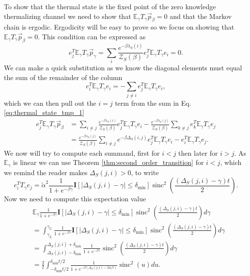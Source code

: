 \documentclass{article}
\newcommand{\EE}{\mathbb{E}}
\newcommand{\partfun}{\mathcal{Z}}
\DeclareMathOperator{\sinc}{sinc}
\begin{document}
To show that the thermal state is the fixed point of the zero knowledge thermalizing channel we need to show that 
$\EE_\gamma T_\gamma \vec{p}_{\beta} = 0$ and that the Markov chain is ergodic. Ergodicity will be easy to prove so we focus on showing that $\EE_\gamma T_\gamma \vec{p}_{\beta} = 0$. This condition can be expressed as
\begin{equation}
    e_j^T \EE_\gamma T_\gamma \vec{p}_{\gamma} = \sum_i \frac{e^{-\beta \lambda_S(i)}}{\partfun_S(\beta)} e_j^T \EE_\gamma T_\gamma e_i = 0.   \label{eq:thermal_state_tmp_1}
\end{equation}
We can make a quick substitution as we know the diagonal elements must equal the sum of the remainder of the column 
\begin{equation}
    e_i^T \EE_\gamma T_\gamma e_i = - \sum_{j \neq i} e_j^T \EE_\gamma T_\gamma e_i,
\end{equation}
which we can then pull out the $i = j$ term from the sum in Eq. \eqref{eq:thermal_state_tmp_1}
\begin{align}
    e_j^T \EE_\gamma T_\gamma \vec{p}_{\beta} &= \sum_{i \neq j} \frac{e^{-\beta \lambda_S(i)}}{\partfun_S(\beta)} e_j^T \EE_\gamma T_\gamma e_i - \frac{e^{-\beta \lambda_S(j)}}{\partfun_S(\beta)} \sum_{k \neq j} e_k^T \EE_\gamma T_\gamma e_j \\
    &= \frac{e^{-\beta \lambda_S(j)}}{\partfun_S(\beta)} \sum_{i \neq j}   e^{-\beta \Delta_S(i ,j)} e_j^T \EE_\gamma T_\gamma e_i - e_i^T \EE_\gamma T_\gamma e_j . \label{eq:thermal_state_tmp_2}
\end{align}
We now will try to compute each summand, first for $i < j$ then later for $i > j$. As $\EE_\gamma$ is linear we can use Theorem \ref{thm:second_order_transition} for $i < j$, which we remind the reader makes $\Delta_S(j, i) > 0$, to write
\begin{equation}
    e_i^T T_\gamma e_j = \widetilde{\alpha}^2 \frac{1}{1 + e^{-\beta \gamma}} \mathbf{I}[|\Delta_S(j, i) - \gamma| \le \delta_{\min}] \sinc^2 \left( \frac{(\Delta_S(j,i) - \gamma) t}{2} \right). 
\end{equation}
Now we need to compute this expectation value
\begin{align}
    &\EE_\gamma \frac{1}{1 + e^{-\beta \gamma}} \mathbf{I}[|\Delta_S(j, i) - \gamma| \le \delta_{\min}] \sinc^2 \left( \frac{(\Delta_S(j,i) - \gamma) t}{2} \right) d\gamma \\
    &= \int_{\gamma_L}^{\gamma_U} \frac{1}{1 + e^{-\beta \gamma}} \mathbf{I}[|\Delta_S(j, i) - \gamma| \le \delta_{\min}] \sinc^2 \left( \frac{(\Delta_S(j,i) - \gamma) t}{2} \right) d\gamma \\
    &= \int_{\Delta_S(j,i) - \delta_{\min}}^{\Delta_S(j,i) + \delta_{\min}} \frac{1}{1 + e^{-\beta \gamma}} \sinc^2 \left( \frac{(\Delta_S(j,i) - \gamma) t}{2} \right) d\gamma \\
    &= \frac{2}{t} \int_{-\delta_{\min} t /2}^{\delta_{\min} t / 2} \frac{1}{1 + e^{-\beta (\Delta_S(j,i) - 2 u /t)}} \sinc^2(u) du.
\end{align}
\end{document}

